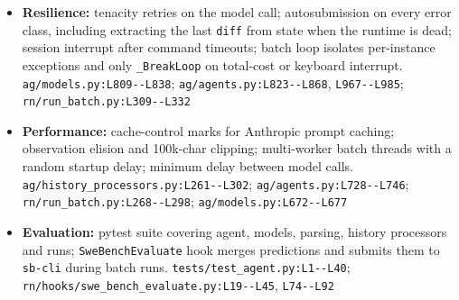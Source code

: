 \begin{itemize}
\item \textbf{Resilience:} tenacity retries on the model call; autosubmission on every error class, including extracting the last \texttt{diff} from state when the runtime is dead; session interrupt after command timeouts; batch loop isolates per-instance exceptions and only \texttt{\_\allowbreak{}BreakLoop} on total-cost or keyboard interrupt. \texttt{ag/\allowbreak{}models.\allowbreak{}py:\allowbreak{}L809-\allowbreak{}-\allowbreak{}L838}; \texttt{ag/\allowbreak{}agents.\allowbreak{}py:\allowbreak{}L823-\allowbreak{}-\allowbreak{}L868}, \texttt{L967-\allowbreak{}-\allowbreak{}L985}; \texttt{rn/\allowbreak{}run\_\allowbreak{}batch.\allowbreak{}py:\allowbreak{}L309-\allowbreak{}-\allowbreak{}L332}
\item \textbf{Performance:} cache-control marks for Anthropic prompt caching; observation elision and 100k-char clipping; multi-worker batch threads with a random startup delay; minimum delay between model calls. \texttt{ag/\allowbreak{}history\_\allowbreak{}processors.\allowbreak{}py:\allowbreak{}L261-\allowbreak{}-\allowbreak{}L302}; \texttt{ag/\allowbreak{}agents.\allowbreak{}py:\allowbreak{}L728-\allowbreak{}-\allowbreak{}L746}; \texttt{rn/\allowbreak{}run\_\allowbreak{}batch.\allowbreak{}py:\allowbreak{}L268-\allowbreak{}-\allowbreak{}L298}; \texttt{ag/\allowbreak{}models.\allowbreak{}py:\allowbreak{}L672-\allowbreak{}-\allowbreak{}L677}
\item \textbf{Evaluation:} pytest suite covering agent, models, parsing, history processors and runs; \texttt{SweBenchEvaluate} hook merges predictions and submits them to \texttt{sb-\allowbreak{}cli} during batch runs. \texttt{tests/\allowbreak{}test\_\allowbreak{}agent.\allowbreak{}py:\allowbreak{}L1-\allowbreak{}-\allowbreak{}L40}; \texttt{rn/\allowbreak{}hooks/\allowbreak{}swe\_\allowbreak{}bench\_\allowbreak{}evaluate.\allowbreak{}py:\allowbreak{}L19-\allowbreak{}-\allowbreak{}L45}, \texttt{L74-\allowbreak{}-\allowbreak{}L92}
\end{itemize}

